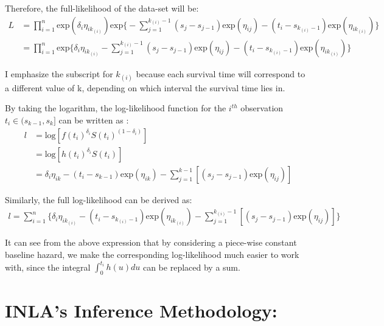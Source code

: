 \documentclass[]{article}
\begin{document}
Therefore, the full-likelihood of the data-set will be:
\begin{equation}\begin{aligned}\label{eqn:fulllike}
L &=  \prod_{i=1}^{n} \text{exp}(\delta_i \eta_{ik_{(i)}}) \text{exp} \bigg\{-\sum_{j=1}^{k_{(i)}-1} (s_{j}-s_{j-1})\text{exp}(\eta_{ij})-(t_i - s_{k_{(i)}-1})\text{exp}(\eta_{ik_{(i)}})\bigg \} \\
  &= \prod_{i=1}^{n} \text{exp} \big \{\delta_i \eta_{ik_{(i)}} -\sum_{j=1}^{k_{(i)}-1} (s_{j}-s_{j-1})\text{exp}(\eta_{ij})-(t_i - s_{k_{(i)}-1})\text{exp}(\eta_{ik_{(i)}}) \big \}
\end{aligned}\end{equation}

I emphasize the subscript for \(k_{(i)}\) because each survival time
will correspond to a different value of k, depending on which interval
the survival time lies in.

By taking the logarithm, the log-likelihood function for the \(i^{th}\)
observation \(t_i \in (s_{k-1},s_k]\) can be written as :
\begin{equation}\begin{aligned}\label{eqn:loglike}
l &= \text{log}[f(t_i)^{\delta_i}S(t_i)^{(1-\delta_i)}] \\
  &= \text{log}[h(t_i)^{\delta_i}S(t_i)]\\
  &= \delta_i \eta_{ik} - (t_i-s_{k-1})\text{exp}(\eta_{ik})-\sum_{j=1}^{k-1} [(s_{j}-s_{j-1})\text{exp}(\eta_{ij})]
\end{aligned}\end{equation}

Similarly, the full log-likelihood can be derived as:
\begin{equation}\begin{aligned}\label{eqn:fullloglike1}
l = \sum_{i=1}^{n} \bigg \{ \delta_i \eta_{ik_{(i)}} - (t_i-s_{k_{(i)}-1})\text{exp}(\eta_{ik_{(i)}})-\sum_{j=1}^{{k_{(i)}}-1} [(s_{j}-s_{j-1})\text{exp}(\eta_{ij})]\bigg \}
\end{aligned}\end{equation}

It can see from the above expression that by considering a piece-wise
constant baseline hazard, we make the corresponding log-likelihood much
easier to work with, since the integral \(\int_{0}^{t_i} h(u)du\) can be
replaced by a sum.

\newpage

\hypertarget{inlas-inference-methodology}{%
\section{INLA's Inference
Methodology:}\label{inlas-inference-methodology}}
\end{document}
